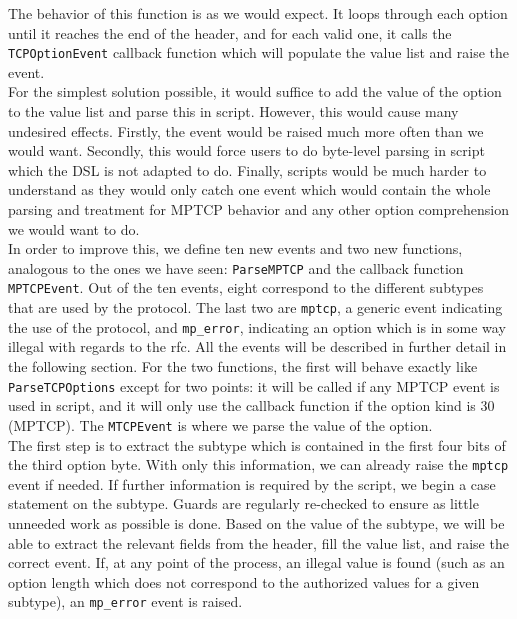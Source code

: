 The behavior of this function is as we would expect. It loops through each option until it reaches the end of the header, and for each valid one, it calls the \texttt{TCPOptionEvent} callback function which will populate the value list and raise the event. \\

For the simplest solution possible, it would suffice to add the value of the option to the value list and parse this in script. However, this would cause many undesired effects. Firstly, the event would be raised much more often than we would want. Secondly, this would force users to do byte-level parsing in script which the DSL is not adapted to do. Finally, scripts would be much harder to understand as they would only catch one event which would contain the whole parsing and treatment for MPTCP behavior and any other option comprehension we would want to do. \\

In order to improve this, we define ten new events and two new functions, analogous to the ones we have seen: \texttt{ParseMPTCP} and the callback function \texttt{MPTCPEvent}. Out of the ten events, eight correspond to the different subtypes that are used by the protocol. The last two are \texttt{mptcp}, a generic event indicating the use of the protocol, and \texttt{mp\_error}, indicating an option which is in some way illegal with regards to the rfc. All the events will be described in further detail in the following section. For the two functions, the first will behave exactly like \texttt{ParseTCPOptions} except for two points: it will be called if any MPTCP event is used in script, and it will only use the callback function if the option kind is 30 (MPTCP). The \texttt{MTCPEvent} is where we parse the value of the option. \\

The first step is to extract the subtype which is contained in the first four bits of the third option byte. With only this information, we can already raise the \texttt{mptcp} event if needed. If further information is required by the script, we begin a case statement on the subtype. Guards are regularly re-checked to ensure as little unneeded work as possible is done. Based on the value of the subtype, we will be able to extract the relevant fields from the header, fill the value list, and raise the correct event. If, at any point of the process, an illegal value is found (such as an option length which does not correspond to the authorized values for a given subtype), an \texttt{mp\_error} event is raised.

